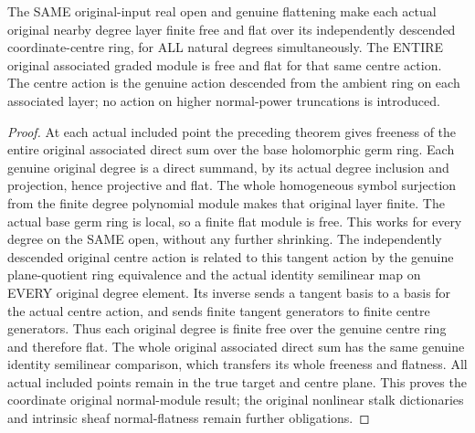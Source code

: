 \begin{theorem}
\label{hir:real-domain-original-all-degree-canonical-centre-free-open}
\leanok
The SAME original-input real open and genuine flattening make each actual
original nearby degree layer finite free and flat over its independently
descended coordinate-centre ring, for ALL natural degrees simultaneously.
The ENTIRE original associated graded module is free and flat for that same
centre action. The centre action is the genuine action descended from the
ambient ring on each associated layer; no action on higher normal-power
truncations is introduced.
\end{theorem}
\begin{proof}
At each actual included point the preceding theorem gives freeness of the
entire original associated direct sum over the base holomorphic germ ring.
Each genuine original degree is a direct summand, by its actual degree
inclusion and projection, hence projective and flat. The whole homogeneous
symbol surjection from the finite degree polynomial module makes that
original layer finite. The actual base germ ring is local, so a finite flat
module is free. This works for every degree on the SAME open, without any
further shrinking. The independently descended original centre action is
related to this tangent action by the genuine plane-quotient ring equivalence
and the actual identity semilinear map on EVERY original degree element.
Its inverse sends a tangent basis to a basis for the actual centre action,
and sends finite tangent generators to finite centre generators. Thus each
original degree is finite free over the genuine centre ring and therefore
flat. The whole original associated direct sum has the same genuine identity
semilinear comparison, which transfers its whole freeness and flatness.
All actual included points remain in the true target and centre plane. This
proves the coordinate original normal-module result; the original nonlinear
stalk dictionaries and intrinsic sheaf normal-flatness remain further
obligations.
\end{proof}
